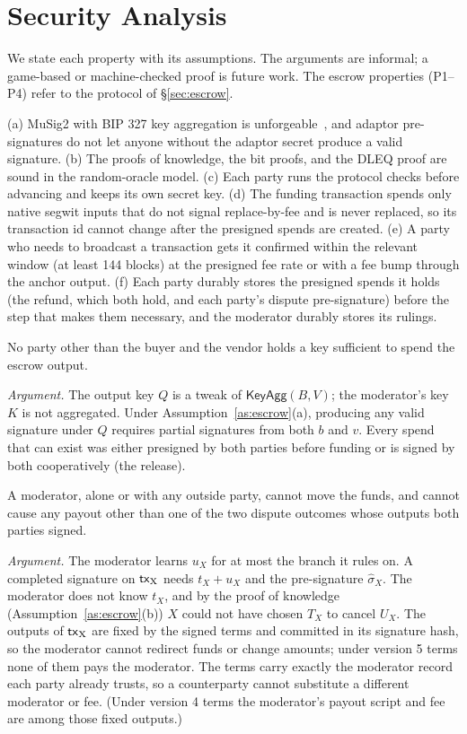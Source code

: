 \section{Security Analysis}
\label{sec:security}

We state each property with its assumptions. The arguments are informal; a game-based or machine-checked proof is future work. The escrow properties (P1--P4) refer to the protocol of \S\ref{sec:escrow}.

\begin{assumption}[Escrow]\label{as:escrow}
(a) MuSig2 with BIP 327 key aggregation is unforgeable~\citep{nick2021musig2}, and adaptor pre-signatures do not let anyone without the adaptor secret produce a valid signature. (b) The proofs of knowledge, the bit proofs, and the DLEQ proof are sound in the random-oracle model. (c) Each party runs the protocol checks before advancing and keeps its own secret key. (d) The funding transaction spends only native segwit inputs that do not signal replace-by-fee and is never replaced, so its transaction id cannot change after the presigned spends are created. (e) A party who needs to broadcast a transaction gets it confirmed within the relevant window (at least 144 blocks) at the presigned fee rate or with a fee bump through the anchor output. (f) Each party durably stores the presigned spends it holds (the refund, which both hold, and each party's dispute pre-signature) before the step that makes them necessary, and the moderator durably stores its rulings.
\end{assumption}

\begin{property}[No custody]
No party other than the buyer and the vendor holds a key sufficient to spend the escrow output.
\end{property}
\noindent\emph{Argument.} The output key $Q$ is a tweak of $\mathsf{KeyAgg}(B,V)$; the moderator's key $K$ is not aggregated. Under Assumption~\ref{as:escrow}(a), producing any valid signature under $Q$ requires partial signatures from both $b$ and $v$. Every spend that can exist was either presigned by both parties before funding or is signed by both cooperatively (the release).

\begin{property}
A moderator, alone or with any outside party, cannot move the funds, and cannot cause any payout other than one of the two dispute outcomes whose outputs both parties signed.
\end{property}
\noindent\emph{Argument.} The moderator learns $u_X$ for at most the branch it rules on. A completed signature on $\mathsf{tx}_{\mathrm{X}}$ needs $t_X+u_X$ and the pre-signature $\hat\sigma_X$. The moderator does not know $t_X$, and by the proof of knowledge (Assumption~\ref{as:escrow}(b)) $X$ could not have chosen $T_X$ to cancel $U_X$. The outputs of $\mathsf{tx}_{\mathrm{X}}$ are fixed by the signed terms and committed in its signature hash, so the moderator cannot redirect funds or change amounts; under version 5 terms none of them pays the moderator. The terms carry exactly the moderator record each party already trusts, so a counterparty cannot substitute a different moderator or fee. (Under version 4 terms the moderator's payout script and fee are among those fixed outputs.)

